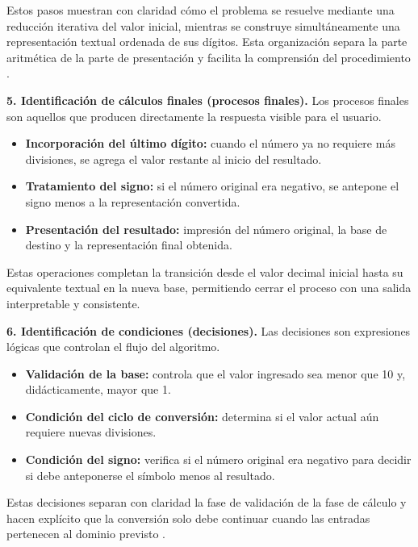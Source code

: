 \documentclass[12pt,twoside]{book}
\begin{document}
					\noindent
					Estos pasos muestran con claridad cómo el problema se resuelve mediante una reducción iterativa del valor inicial, mientras se construye simultáneamente una representación textual ordenada de sus dígitos. Esta organización separa la parte aritmética de la parte de presentación y facilita la comprensión del procedimiento \cite{Cormen2022Introduction,Sebesta2018Concepts}.
					
					\noindent
					\textbf{5. Identificación de cálculos finales (procesos finales).}
					Los procesos finales son aquellos que producen directamente la respuesta visible para el usuario.
					
					\begin{itemize}
						\item \textbf{Incorporación del último dígito:} cuando el número ya no requiere más divisiones, se agrega el valor restante al inicio del resultado.
						\item \textbf{Tratamiento del signo:} si el número original era negativo, se antepone el signo menos a la representación convertida.
						\item \textbf{Presentación del resultado:} impresión del número original, la base de destino y la representación final obtenida.
					\end{itemize}
					
					\noindent
					Estas operaciones completan la transición desde el valor decimal inicial hasta su equivalente textual en la nueva base, permitiendo cerrar el proceso con una salida interpretable y consistente.
					
					\noindent
					\textbf{6. Identificación de condiciones (decisiones).}
					Las decisiones son expresiones lógicas que controlan el flujo del algoritmo.
					
					\begin{itemize}
						\item \textbf{Validación de la base:} controla que el valor ingresado sea menor que 10 y, didácticamente, mayor que 1.
						\item \textbf{Condición del ciclo de conversión:} determina si el valor actual aún requiere nuevas divisiones.
						\item \textbf{Condición del signo:} verifica si el número original era negativo para decidir si debe anteponerse el símbolo menos al resultado.
					\end{itemize}
					
					\noindent
					Estas decisiones separan con claridad la fase de validación de la fase de cálculo y hacen explícito que la conversión solo debe continuar cuando las entradas pertenecen al dominio previsto \cite{Sebesta2018Concepts,Farrell2018Programming}.
					
\end{document}
